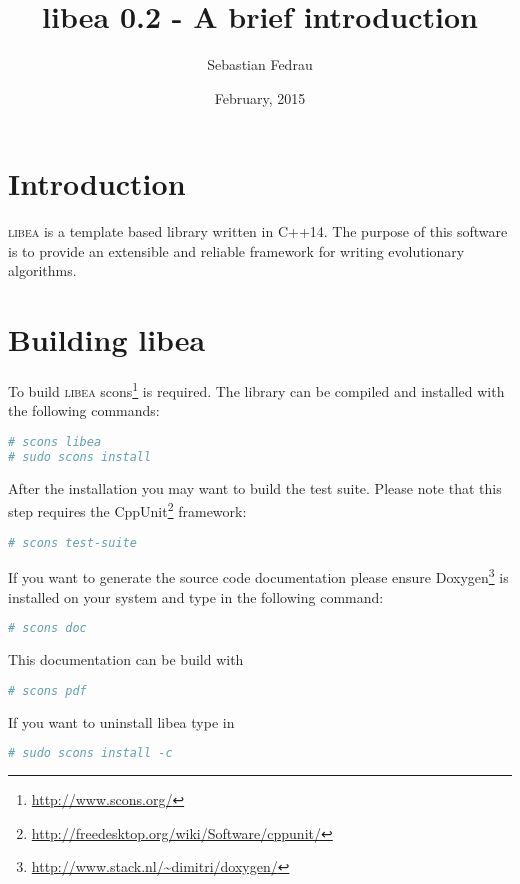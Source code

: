 \documentclass[a4paper]{article}
\title{libea 0.2 - A brief introduction}
\author{Sebastian Fedrau}
\date{February, 2015}
\begin{document}
\maketitle

\newpage

\section{Introduction}

\textsc{libea} is a template based library written in C++14. The purpose of this software is to provide an extensible and reliable framework for writing evolutionary algorithms.

\section{Building libea}

To build \textsc{libea} scons\footnote{\url{http://www.scons.org/}} is required. The library can be compiled and installed with the following commands:

\begin{lstlisting}[language=bash, numbers=none]
# scons libea
# sudo scons install
\end{lstlisting}

After the installation you may want to build the test suite. Please note that this step requires the CppUnit\footnote{\url{http://freedesktop.org/wiki/Software/cppunit/}} framework:

\begin{lstlisting}[language=bash, numbers=none]
# scons test-suite
\end{lstlisting}

If you want to generate the source code documentation please ensure Doxygen\footnote{\url{http://www.stack.nl/~dimitri/doxygen/}} is installed on your system and type in the following command:

\begin{lstlisting}[language=bash, numbers=none]
# scons doc
\end{lstlisting}

This documentation can be build with

\begin{lstlisting}[language=bash, numbers=none]
# scons pdf
\end{lstlisting}

If you want to uninstall libea type in

\begin{lstlisting}[language=bash, numbers=none]
# sudo scons install -c
\end{lstlisting}
\end{document}
